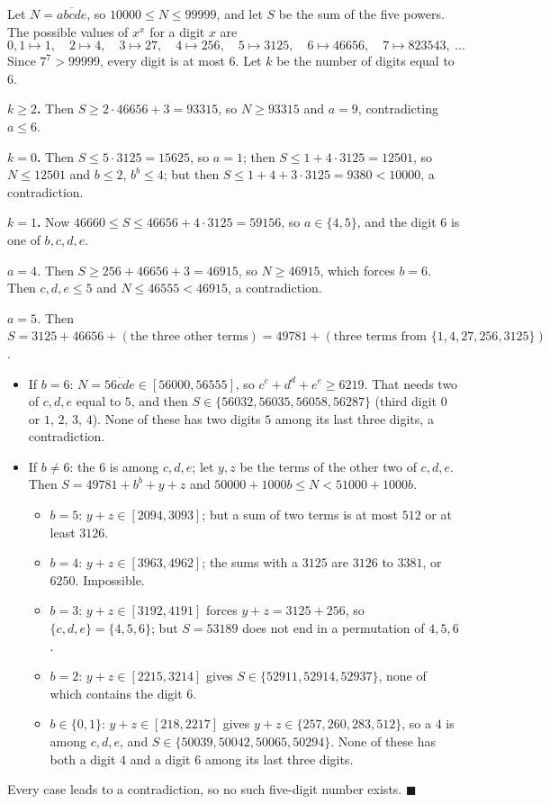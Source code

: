 Let $N=\overline{abcde}$, so $10000\le N\le99999$, and let $S$ be the sum of the five powers. The possible values of $x^x$ for a digit $x$ are
\[
0,1\mapsto1,\quad 2\mapsto4,\quad 3\mapsto27,\quad 4\mapsto256,\quad 5\mapsto3125,\quad 6\mapsto46656,\quad 7\mapsto823543,\ \dots
\]
Since $7^7>99999$, every digit is at most $6$. Let $k$ be the number of digits equal to $6$.

\textbf{$k\ge2$.} Then $S\ge2\cdot46656+3=93315$, so $N\ge93315$ and $a=9$, contradicting $a\le6$.

\textbf{$k=0$.} Then $S\le5\cdot3125=15625$, so $a=1$; then $S\le1+4\cdot3125=12501$, so $N\le12501$ and $b\le2$, $b^b\le4$; but then $S\le1+4+3\cdot3125=9380<10000$, a contradiction.

\textbf{$k=1$.} Now $46660\le S\le46656+4\cdot3125=59156$, so $a\in\{4,5\}$, and the digit $6$ is one of $b,c,d,e$.

\emph{$a=4$.} Then $S\ge256+46656+3=46915$, so $N\ge46915$, which forces $b=6$. Then $c,d,e\le5$ and $N\le46555<46915$, a contradiction.

\emph{$a=5$.} Then $S=3125+46656+(\text{the three other terms})=49781+(\text{three terms from }\{1,4,27,256,3125\})$.
\begin{itemize}
\item If $b=6$: $N=\overline{56cde}\in[56000,56555]$, so $c^c+d^d+e^e\ge6219$. That needs two of $c,d,e$ equal to $5$, and then $S\in\{56032,56035,56058,56287\}$ (third digit $0$ or $1$, $2$, $3$, $4$). None of these has two digits $5$ among its last three digits, a contradiction.
\item If $b\ne6$: the $6$ is among $c,d,e$; let $y,z$ be the terms of the other two of $c,d,e$. Then $S=49781+b^b+y+z$ and $50000+1000b\le N<51000+1000b$.
\begin{itemize}
\item $b=5$: $y+z\in[2094,3093]$; but a sum of two terms is at most $512$ or at least $3126$.
\item $b=4$: $y+z\in[3963,4962]$; the sums with a $3125$ are $3126$ to $3381$, or $6250$. Impossible.
\item $b=3$: $y+z\in[3192,4191]$ forces $y+z=3125+256$, so $\{c,d,e\}=\{4,5,6\}$; but $S=53189$ does not end in a permutation of $4,5,6$.
\item $b=2$: $y+z\in[2215,3214]$ gives $S\in\{52911,52914,52937\}$, none of which contains the digit $6$.
\item $b\in\{0,1\}$: $y+z\in[218,2217]$ gives $y+z\in\{257,260,283,512\}$, so a $4$ is among $c,d,e$, and $S\in\{50039,50042,50065,50294\}$. None of these has both a digit $4$ and a digit $6$ among its last three digits.
\end{itemize}
\end{itemize}
Every case leads to a contradiction, so no such five-digit number exists. $\blacksquare$
